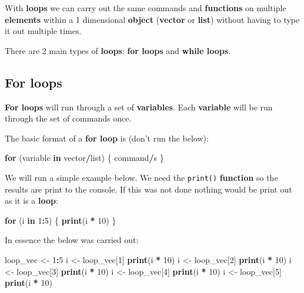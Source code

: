 \documentclass[]{book}
\newenvironment{Shaded}{\begin{snugshade}}{\end{snugshade}}
\newcommand{\KeywordTok}[1]{\textcolor[rgb]{0.13,0.29,0.53}{\textbf{#1}}}
\newcommand{\DecValTok}[1]{\textcolor[rgb]{0.00,0.00,0.81}{#1}}
\newcommand{\StringTok}[1]{\textcolor[rgb]{0.31,0.60,0.02}{#1}}
\newcommand{\ControlFlowTok}[1]{\textcolor[rgb]{0.13,0.29,0.53}{\textbf{#1}}}
\newcommand{\OperatorTok}[1]{\textcolor[rgb]{0.81,0.36,0.00}{\textbf{#1}}}
\newcommand{\NormalTok}[1]{#1}
\begin{document}
With \textbf{loops} we can carry out the same commands and
\textbf{functions} on multiple \textbf{elements} within a 1 dimensional
\textbf{object} (\textbf{vector} or \textbf{list}) without having to
type it out multiple times.

There are 2 main types of \textbf{loops}: \textbf{for loops} and
\textbf{while loops}.

\subsection{For loops}\label{for-loops}

\textbf{For loops} will run through a set of \textbf{variables}. Each
\textbf{variable} will be run through the set of commands once.

The basic format of a \textbf{for loop} is (don't run the below):

\begin{Shaded}
\begin{Highlighting}[]
\ControlFlowTok{for}\NormalTok{ (variable }\ControlFlowTok{in}\NormalTok{ vector}\OperatorTok{/}\NormalTok{list) \{}
\NormalTok{  command}\OperatorTok{/}\NormalTok{s}
\NormalTok{\}}
\end{Highlighting}
\end{Shaded}

We will run a simple example below. We need the \texttt{print()}
\textbf{function} so the results are print to the console. If this was
not done nothing would be print out as it is a \textbf{loop}:

\begin{Shaded}
\begin{Highlighting}[]
\ControlFlowTok{for}\NormalTok{ (i }\ControlFlowTok{in} \DecValTok{1}\OperatorTok{:}\DecValTok{5}\NormalTok{) \{}
  \KeywordTok{print}\NormalTok{(i }\OperatorTok{*}\StringTok{ }\DecValTok{10}\NormalTok{)}
\NormalTok{\}}
\end{Highlighting}
\end{Shaded}

In essence the below was carried out:

\begin{Shaded}
\begin{Highlighting}[]
\NormalTok{loop_vec <-}\StringTok{ }\DecValTok{1}\OperatorTok{:}\DecValTok{5}
\NormalTok{i <-}\StringTok{ }\NormalTok{loop_vec[}\DecValTok{1}\NormalTok{]}
\KeywordTok{print}\NormalTok{(i }\OperatorTok{*}\StringTok{ }\DecValTok{10}\NormalTok{)}
\NormalTok{i <-}\StringTok{ }\NormalTok{loop_vec[}\DecValTok{2}\NormalTok{]}
\KeywordTok{print}\NormalTok{(i }\OperatorTok{*}\StringTok{ }\DecValTok{10}\NormalTok{)}
\NormalTok{i <-}\StringTok{ }\NormalTok{loop_vec[}\DecValTok{3}\NormalTok{]}
\KeywordTok{print}\NormalTok{(i }\OperatorTok{*}\StringTok{ }\DecValTok{10}\NormalTok{)}
\NormalTok{i <-}\StringTok{ }\NormalTok{loop_vec[}\DecValTok{4}\NormalTok{]}
\KeywordTok{print}\NormalTok{(i }\OperatorTok{*}\StringTok{ }\DecValTok{10}\NormalTok{)}
\NormalTok{i <-}\StringTok{ }\NormalTok{loop_vec[}\DecValTok{5}\NormalTok{]}
\KeywordTok{print}\NormalTok{(i }\OperatorTok{*}\StringTok{ }\DecValTok{10}\NormalTok{)}
\end{Highlighting}
\end{Shaded}
\end{document}
